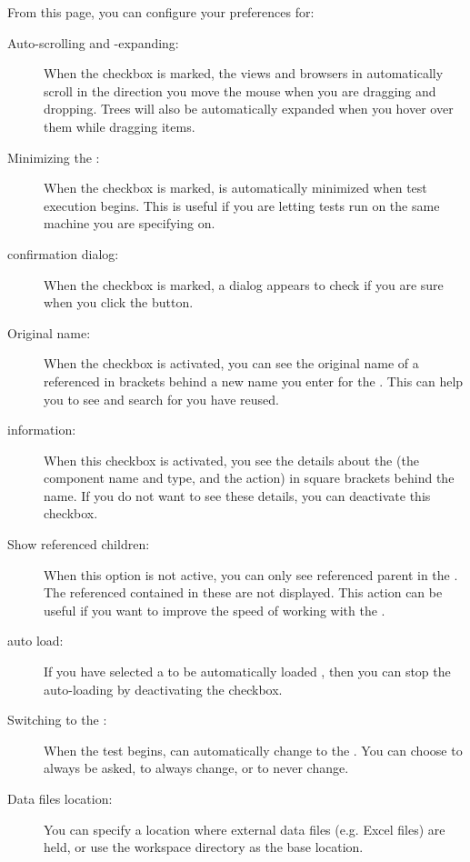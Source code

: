 From this page, you can configure your preferences for:
\begin{description}
\item [Auto-scrolling and -expanding:]{When the checkbox is marked, the views and browsers in \app{} automatically scroll in the direction you move the mouse when you are dragging and dropping. Trees will also be automatically expanded when you hover over them while dragging items.}
\item [Minimizing the \ite{}:]{When the checkbox is marked, \app{} is automatically minimized when test execution begins. This is useful if you are letting tests run on the same machine you are specifying on.}
\item [\gdaut{} confirmation dialog:]{When the checkbox is marked, a dialog appears to check if you are sure when you click the   button.}
\item [Original \gdcase{} name:]{When the checkbox is activated, you can see the original name of a referenced \gdcase{} in brackets behind a new name you enter for the \gdcase{}. This can help you to see and search for \gdcases{} you have reused. }
\item[\gdstep{} information:]{When this checkbox is activated, you see the details about the \gdstep{} (the component name and type, and the action) in square brackets behind the \gdstep{} name. If you do not want to see these details, you can deactivate this checkbox.}
\item[Show referenced children:]{When this option is not active, you can only see  referenced parent \gdcases{} in the \gdtestcasebrowser{}. The referenced \gdcases{} contained in these \gdcases{} are not displayed. This action can be useful if you want to improve the speed of working with the \ite{}.}
\item [\gdproject{} auto load:]{If you have selected a \gdproject{} to be automatically loaded , then you can stop the auto-loading by deactivating the checkbox.}
\item [Switching to the \execpersp{}:]{When the test begins, \app{} can automatically change to the \execpersp{}. You can choose to always be asked, to always change, or to never change. }
\item [Data files location:]{You can specify a location where external data files (e.g. Excel files) are held, or use the workspace directory as the base location. }
\end{description}

 

